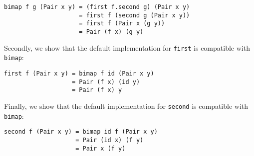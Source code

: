 \documentclass{article}
\begin{document}
\begin{lstlisting}
bimap f g (Pair x y) = (first f.second g) (Pair x y)
                     = first f (second g (Pair x y))
                     = first f (Pair x (g y))
                     = Pair (f x) (g y)
\end{lstlisting}

Secondly, we show that the default implementation for \lstinline{first} is
compatible with \lstinline{bimap}:

\begin{lstlisting}
first f (Pair x y) = bimap f id (Pair x y)
                   = Pair (f x) (id y)
                   = Pair (f x) y
\end{lstlisting}

Finally, we show that the default implementation for \lstinline{second} is
compatible with \lstinline{bimap}:

\begin{lstlisting}
second f (Pair x y) = bimap id f (Pair x y)
                    = Pair (id x) (f y)
                    = Pair x (f y)
\end{lstlisting}
\end{document}
